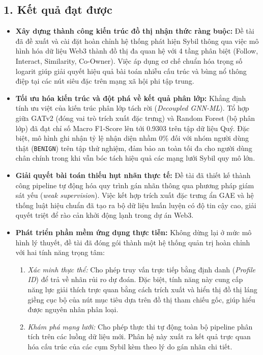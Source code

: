 \subsection{1. Kết quả đạt được}

\begin{itemize}[label={--}, itemsep=1pt]
    \item \textbf{Xây dựng thành công kiến trúc đồ thị nhận thức ràng buộc:} Đề tài đã đề xuất và cài đặt hoàn chỉnh hệ thống phát hiện Sybil thông qua việc mô hình hóa dữ liệu Web3 thành đồ thị đa quan hệ với 4 tầng phân biệt (Follow, Interact, Similarity, Co-Owner). Việc áp dụng cơ chế chuẩn hóa trọng số logarit giúp giải quyết hiệu quả bài toán nhiễu cấu trúc và bùng nổ thông điệp tại các nút siêu đặc trên mạng xã hội phi tập trung.
    
    \item \textbf{Tối ưu hóa kiến trúc và đột phá về kết quả phân lớp:} Khẳng định tính ưu việt của kiến trúc phân lớp tách rời (\textit{Decoupled GNN-ML}). Tổ hợp giữa GATv2 (đóng vai trò trích xuất đặc trưng) và Random Forest (bộ phân lớp) đã đạt chỉ số Macro F1-Score lên tới 0.9303 trên tập dữ liệu Quý. Đặc biệt, mô hình ghi nhận tỷ lệ nhận diện nhầm 0\% đối với nhóm người dùng thật (\texttt{BENIGN}) trên tập thử nghiệm, đảm bảo an toàn tối đa cho người dùng chân chính trong khi vẫn bóc tách hiệu quả các mạng lưới Sybil quy mô lớn.
    
    \item \textbf{Giải quyết bài toán thiếu hụt nhãn thực tế:} Đề tài đã thiết kế thành công pipeline tự động hóa quy trình gán nhãn thông qua phương pháp giám sát yếu (\textit{weak supervision}). Việc kết hợp trích xuất đặc trưng ẩn GAE và hệ thống luật hiệu chuẩn đã tạo ra bộ dữ liệu huấn luyện có độ tin cậy cao, giải quyết triệt để rào cản khởi động lạnh trong dự án Web3.
    
    \item \textbf{Phát triển phần mềm ứng dụng thực tiễn:} Không dừng lại ở mức mô hình lý thuyết, đề tài đã đóng gói thành một hệ thống quản trị hoàn chỉnh với hai tính năng trọng tâm:
    \begin{enumerate}
        \item[(1)] \textit{Xác minh thực thể:} Cho phép truy vấn trực tiếp bằng định danh (\textit{Profile ID}) để trả về nhãn rủi ro dự đoán. Đặc biệt, tính năng này cung cấp năng lực giải thích trực quan bằng cách trích xuất và hiển thị đồ thị láng giềng cục bộ của nút mục tiêu dựa trên đồ thị tham chiếu gốc, giúp hiểu được nguyên nhân phân loại.
        \item[(2)] \textit{Khám phá mạng lưới:} Cho phép thực thi tự động toàn bộ pipeline phân tích trên các luồng dữ liệu mới. Phân hệ này xuất ra kết quả trực quan hóa cấu trúc của các cụm Sybil kèm theo lý do gán nhãn chi tiết.
    \end{enumerate}
\end{itemize}